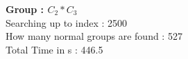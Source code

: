 \textbf{Group : $C_2*C_3$}\\
Searching up to index : 2500\\
How many normal groups are found : 527\\
Total Time in s : 446.5\\
